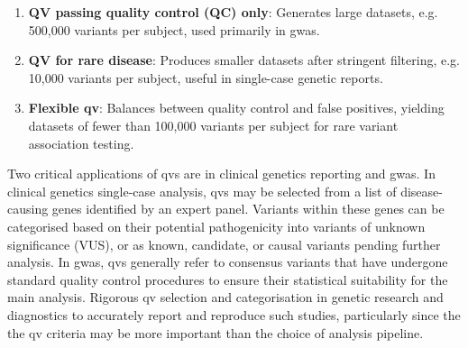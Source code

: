 \begin{enumerate}
    \item \textbf{QV passing quality control (QC) only}: Generates large datasets, e.g. 500,000 variants per subject, used primarily in \ac{gwas}.
    \item \textbf{QV for rare disease}: Produces smaller datasets after stringent filtering, e.g. 10,000 variants per subject, useful in single-case genetic reports.
    \item \textbf{Flexible \ac{qv}}: Balances between quality control and false positives, yielding datasets of fewer than 100,000 variants per subject for rare variant association testing.
\end{enumerate}

Two critical applications of  \ac{qv}s are in clinical genetics reporting and \ac{gwas}. 
In clinical genetics single-case analysis, \ac{qv}s may be selected from a list of disease-causing genes identified by an expert panel. 
Variants within these genes can be categorised based on their potential pathogenicity into variants of unknown significance (VUS), or as known, candidate, or causal variants pending further analysis. 
In \ac{gwas}, \ac{qv}s generally refer to consensus variants that have undergone standard quality control procedures to ensure their statistical suitability for the main analysis.
Rigorous \ac{qv} selection and categorisation in genetic research and diagnostics to accurately report and reproduce such studies, particularly since the the \ac{qv} criteria may be more important than the choice of analysis pipeline. 

